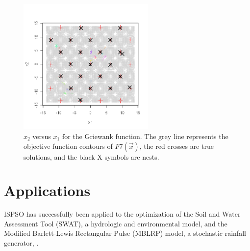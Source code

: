 \documentclass{article}
\begin{document}
\begin{figure}[htbp]
  \centering
  \includegraphics[width=0.6\textwidth]{griewank.png}
  \caption{$x_2$ versus $x_1$ for the Griewank function. The grey line represents the objective function contours of $F7(\vec{x})$, the red crosses are true solutions, and the black X symbols are nests.}
\end{figure}

\section{Applications}

ISPSO has successfully been applied to the optimization of the Soil and Water Assessment Tool (SWAT), a hydrologic and environmental model, \citep{Cho.2008} and the Modified Barlett-Lewis Rectangular Pulse (MBLRP) model, a stochastic rainfall generator, \citep{Cho.ea.2011}.



\end{document}
